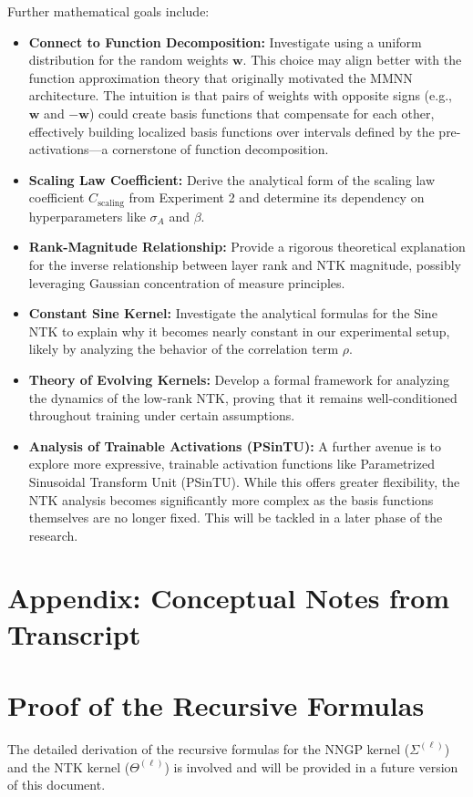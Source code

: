 \documentclass[12pt]{article}
\begin{document}
Further mathematical goals include:
\begin{itemize}
    \item \textbf{Connect to Function Decomposition:} Investigate using a uniform distribution for the random weights $\bm{w}$. This choice may align better with the function approximation theory that originally motivated the MMNN architecture. The intuition is that pairs of weights with opposite signs (e.g., $\bm{w}$ and $-\bm{w}$) could create basis functions that compensate for each other, effectively building localized basis functions over intervals defined by the pre-activations—a cornerstone of function decomposition.
    \item \textbf{Scaling Law Coefficient:} Derive the analytical form of the scaling law coefficient $C_{\text{scaling}}$ from Experiment 2 and determine its dependency on hyperparameters like $\sigma_A$ and $\beta$.
    \item \textbf{Rank-Magnitude Relationship:} Provide a rigorous theoretical explanation for the inverse relationship between layer rank and NTK magnitude, possibly leveraging Gaussian concentration of measure principles.
    \item \textbf{Constant Sine Kernel:} Investigate the analytical formulas for the Sine NTK to explain why it becomes nearly constant in our experimental setup, likely by analyzing the behavior of the correlation term $\rho$.
    \item \textbf{Theory of Evolving Kernels:} Develop a formal framework for analyzing the dynamics of the low-rank NTK, proving that it remains well-conditioned throughout training under certain assumptions.
    \item \textbf{Analysis of Trainable Activations (PSinTU):} A further avenue is to explore more expressive, trainable activation functions like Parametrized Sinusoidal Transform Unit (PSinTU). While this offers greater flexibility, the NTK analysis becomes significantly more complex as the basis functions themselves are no longer fixed. This will be tackled in a later phase of the research.
\end{itemize}


\appendix
\section{Appendix: Conceptual Notes from Transcript}


\section{Proof of the Recursive Formulas}
The detailed derivation of the recursive formulas for the NNGP kernel ($\Sigma^{(\ell)}$) and the NTK kernel ($\Theta^{(\ell)}$) is involved and will be provided in a future version of this document.
\end{document}
